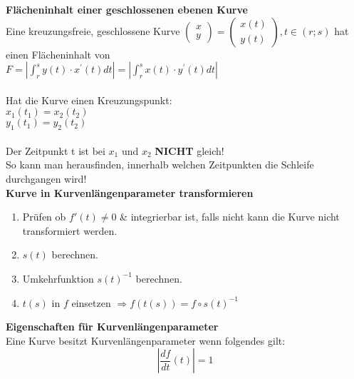 \textbf{Flächeninhalt einer geschlossenen ebenen Kurve}\\
Eine kreuzungsfreie, geschlossene Kurve $\begin{pmatrix} x\\ y \end{pmatrix} = \begin{pmatrix} x(t)\\ y(t) \end{pmatrix}, t \in (r;s)$ hat einen Flächeninhalt von\\
$\boxed{F =  \left | \int_r^s y(t) \cdot x^{'}(t) dt \right | = \left | \int_r^s
x(t) \cdot y^{'}(t) dt \right |}$\\\\
Hat die Kurve einen Kreuzungspunkt:\\ 
$x_1(t_1) = x_2(t_2)$\\
$y_1(t_1) = y_2(t_2)$\\\\
Der Zeitpunkt t ist bei $x_1$ und $x_2$ \textbf{NICHT} gleich!\\
So kann man herausfinden, innerhalb welchen Zeitpunkten die Schleife durchgangen
wird!\\

\textbf{Kurve in Kurvenlängenparameter transformieren}
\begin{enumerate}
  \item Prüfen ob $f'(t)\neq 0$ \& integrierbar ist, falls nicht kann die Kurve
  nicht transformiert werden.
  \item $s(t)$ berechnen.
  \item Umkehrfunktion $s(t)^{-1}$ berechnen.
  \item $t(s)$ in $f$ einsetzen $\Rightarrow f(t(s))= f\circ s(t)^{-1}$
\end{enumerate}
\vspace{0.5cm}
\textbf{Eigenschaften für Kurvenlängenparameter}\\
Eine Kurve besitzt Kurvenlängenparameter wenn folgendes gilt:\\
$$\left|\frac{df}{dt}(t)\right|=1$$

